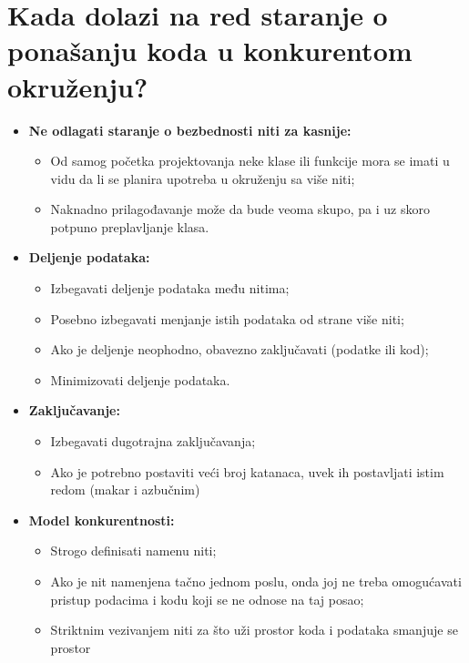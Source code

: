 \documentclass[a4paper]{article}
\begin{document}
\section{Kada dolazi na red staranje o ponašanju koda u konkurentom okruženju?}
  \begin{itemize}
    \item \textbf{Ne odlagati staranje o bezbednosti niti za kasnije:}
          \begin{itemize}
            \item Od samog početka projektovanja neke klase ili funkcije mora se imati u vidu da li se 
                  planira upotreba u okruženju sa više niti;
            \item Naknadno prilagođavanje može da bude veoma skupo, pa i uz skoro potpuno preplavljanje 
                  klasa.
          \end{itemize}
    \item \textbf{Deljenje podataka:}
          \begin{itemize}
            \item Izbegavati deljenje podataka među nitima;
            \item Posebno izbegavati menjanje istih podataka od strane više niti;
            \item Ako je deljenje neophodno, obavezno zaključavati (podatke ili kod);
            \item Minimizovati deljenje podataka.
          \end{itemize}
    \item \textbf{Zaključavanje:}
          \begin{itemize}
            \item Izbegavati dugotrajna zaključavanja;
            \item Ako je potrebno postaviti veći broj katanaca, uvek ih postavljati istim 
                  redom (makar i azbučnim)
          \end{itemize}
    \item \textbf{Model konkurentnosti:}
          \begin{itemize}
            \item Strogo definisati namenu niti;
            \item Ako je nit namenjena tačno jednom poslu, onda joj ne treba omogućavati pristup podacima 
                  i kodu koji se ne odnose na taj posao;
            \item Striktnim vezivanjem niti za što uži prostor koda i podataka smanjuje se prostor 

\end{itemize}
\end{itemize}
\end{document}
